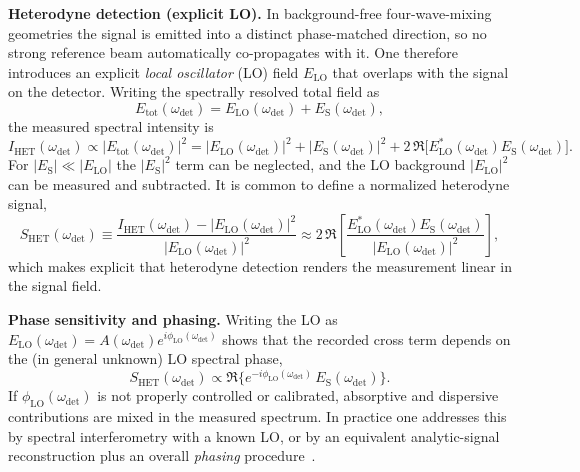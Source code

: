 \medskip

\textbf{Heterodyne detection (explicit LO).}
In background-free four-wave-mixing geometries the signal is emitted into a distinct phase-matched direction, so no strong reference beam automatically co-propagates with it. One therefore introduces an explicit \emph{local oscillator} (LO) field $E_{\mathrm{LO}}$ that overlaps with the signal on the detector.
Writing the spectrally resolved total field as
\begin{equation}
	E_{\mathrm{tot}}(\omega_{\mathrm{det}}) = E_{\mathrm{LO}}(\omega_{\mathrm{det}}) + E_{\mathrm{S}}(\omega_{\mathrm{det}}),
	\label{eq:heterodyne_total_field_freq}
\end{equation}
the measured spectral intensity is
\begin{equation}
	I_{\mathrm{HET}}(\omega_{\mathrm{det}})
	\propto
	\big|E_{\mathrm{tot}}(\omega_{\mathrm{det}})\big|^2
	=
	|E_{\mathrm{LO}}(\omega_{\mathrm{det}})|^2
	+ |E_{\mathrm{S}}(\omega_{\mathrm{det}})|^2
	+ 2\,\Re\big[E_{\mathrm{LO}}^*(\omega_{\mathrm{det}})E_{\mathrm{S}}(\omega_{\mathrm{det}})\big].
	\label{eq:heterodyne_intensity_expanded_freq}
\end{equation}
For $|E_{\mathrm{S}}|\ll|E_{\mathrm{LO}}|$ the $|E_{\mathrm{S}}|^2$ term can be neglected, and the LO background $|E_{\mathrm{LO}}|^2$ can be measured and subtracted. It is common to define a normalized heterodyne signal,
\begin{equation}
	S_{\mathrm{HET}}(\omega_{\mathrm{det}})
	\equiv
	\frac{I_{\mathrm{HET}}(\omega_{\mathrm{det}})-|E_{\mathrm{LO}}(\omega_{\mathrm{det}})|^2}{|E_{\mathrm{LO}}(\omega_{\mathrm{det}})|^2}
	\approx 2\,\Re\left[\frac{E_{\mathrm{LO}}^*(\omega_{\mathrm{det}})E_{\mathrm{S}}(\omega_{\mathrm{det}})}{|E_{\mathrm{LO}}(\omega_{\mathrm{det}})|^2}\right],
	\label{eq:heterodyne_signal_normalized}
\end{equation}
which makes explicit that heterodyne detection renders the measurement linear in the signal field.

\medskip

\textbf{Phase sensitivity and phasing.}
Writing the LO as $E_{\mathrm{LO}}(\omega_{\mathrm{det}})=A(\omega_{\mathrm{det}})e^{i\phi_{\mathrm{LO}}(\omega_{\mathrm{det}})}$ shows that the recorded cross term depends on the (in general unknown) LO spectral phase,
\begin{equation}
	S_{\mathrm{HET}}(\omega_{\mathrm{det}})
	\propto \Re\Big\{e^{-i\phi_{\mathrm{LO}}(\omega_{\mathrm{det}})}\,E_{\mathrm{S}}(\omega_{\mathrm{det}})\Big\}.
	\label{eq:heterodyne_phase_sensitive}
\end{equation}
If $\phi_{\mathrm{LO}}(\omega_{\mathrm{det}})$ is not properly controlled or calibrated, absorptive and dispersive contributions are mixed in the measured spectrum. In practice one addresses this by spectral interferometry with a known LO, or by an equivalent analytic-signal reconstruction plus an overall \emph{phasing} procedure~\cite{hybletal1998twodimensionalelectronicspectroscopy}.

